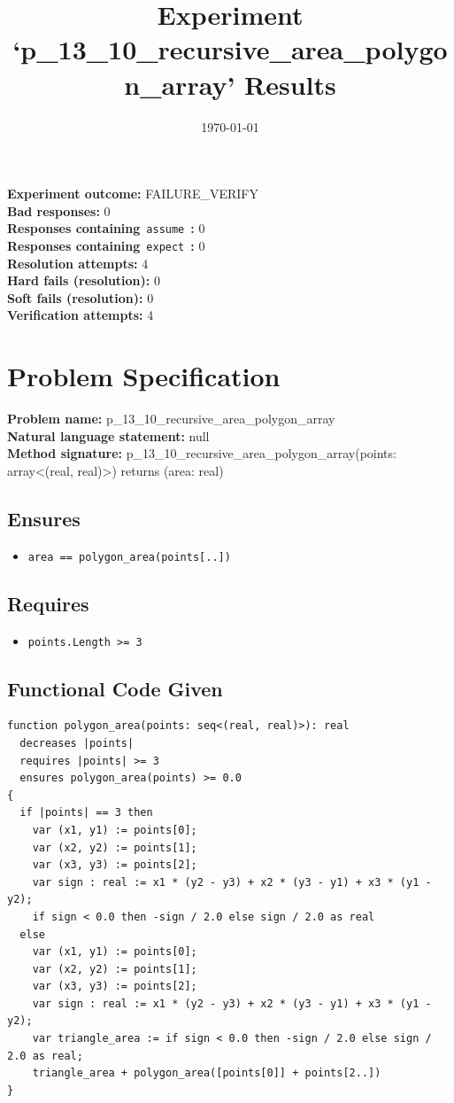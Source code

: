 \documentclass{article}
\begin{document}
\title{Experiment `p\_13\_10\_recursive\_area\_polygon\_array' Results}
\author{\today}
\date{}
\maketitle
\textbf{Experiment outcome: }FAILURE\_VERIFY
\\\textbf{Bad responses: }0
\\\textbf{Responses containing}~\texttt{assume}~\textbf{: }0
\\\textbf{Responses containing}~\texttt{expect}~\textbf{: }0
\\\textbf{Resolution attempts: }4
\\\textbf{Hard fails (resolution): }0
\\\textbf{Soft fails (resolution): }0
\\\textbf{Verification attempts: }4
\section*{Problem Specification}
\textbf{Problem name: }p\_13\_10\_recursive\_area\_polygon\_array
\\\textbf{Natural language statement: }null
\\\textbf{Method signature: }p\_13\_10\_recursive\_area\_polygon\_array(points: array<(real, real)>) returns (area: real)
\subsection*{Ensures}
\begin{itemize}
\item \texttt{area == polygon\_area(points[..])}
\end{itemize}
\subsection*{Requires}
\begin{itemize}
\item \texttt{points.Length >= 3}
\end{itemize}
\subsection*{Functional Code Given}
\begin{lstlisting}
function polygon_area(points: seq<(real, real)>): real
  decreases |points|
  requires |points| >= 3
  ensures polygon_area(points) >= 0.0
{
  if |points| == 3 then 
    var (x1, y1) := points[0];
    var (x2, y2) := points[1];
    var (x3, y3) := points[2];
    var sign : real := x1 * (y2 - y3) + x2 * (y3 - y1) + x3 * (y1 - y2);
    if sign < 0.0 then -sign / 2.0 else sign / 2.0 as real 
  else 
    var (x1, y1) := points[0];
    var (x2, y2) := points[1];
    var (x3, y3) := points[2];
    var sign : real := x1 * (y2 - y3) + x2 * (y3 - y1) + x3 * (y1 - y2);
    var triangle_area := if sign < 0.0 then -sign / 2.0 else sign / 2.0 as real;
    triangle_area + polygon_area([points[0]] + points[2..])
}
\end{lstlisting}
\clearpage
\end{document}
